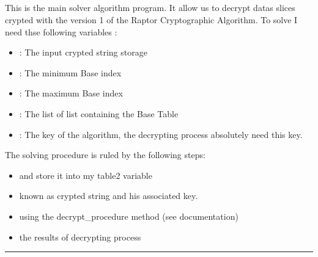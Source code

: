 \documentclass[letterpaper,10pt,english]{sphinxmanual}
\begin{document}
\subsection{}
\label{\detokenize{DescriptionofDecrypterv1:algorithm}}
\sphinxAtStartPar
This is the main solver algorithm program.
It allow us to decrypt datas slices crypted with the version 1 of the Raptor Cryptographic Algorithm.
To solve I need thse following variables :
\begin{itemize}
\item {} 
\sphinxAtStartPar
{} : The input crypted string storage

\item {} 
\sphinxAtStartPar
{} : The minimum Base index

\item {} 
\sphinxAtStartPar
{} : The maximum Base index

\item {} 
\sphinxAtStartPar
{} : The list of list containing the Base Table

\item {} 
\sphinxAtStartPar
{} : The key of the algorithm, the decrypting process absolutely need this key.

\end{itemize}

\sphinxAtStartPar
The solving procedure is ruled by the following steps:
\begin{itemize}
\item {} 
\sphinxAtStartPar
{} and store it into my table2 variable

\item {} 
\sphinxAtStartPar
{} known as crypted string and his associated key.

\item {} 
\sphinxAtStartPar
{} using the decrypt\_procedure method (see documentation)

\item {} 
\sphinxAtStartPar
{} the results of decrypting process

\end{itemize}


\bigskip\hrule\bigskip
\end{document}
